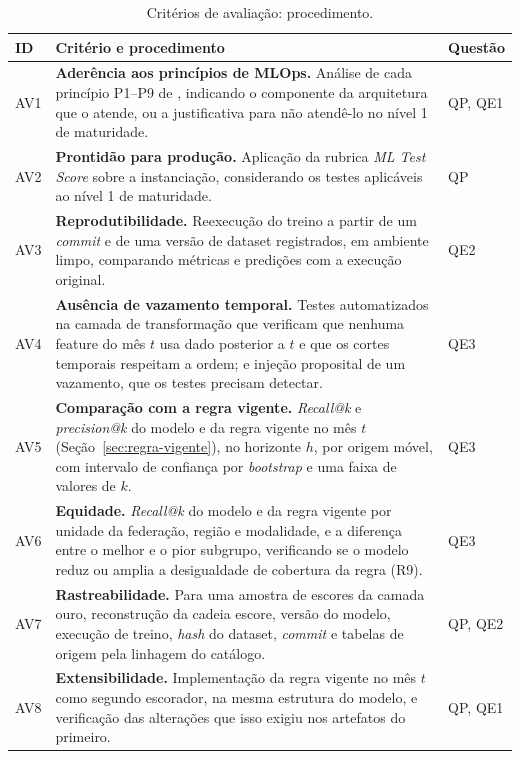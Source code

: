 \begin{table}[htbp]
	\centering
	\caption{Critérios de avaliação: procedimento.}
	\label{tab:avaliacao}
	\small
	\begin{tabularx}{\textwidth}{@{}l>{\raggedright\arraybackslash}X l@{}}
		\toprule
		\textbf{ID} & \textbf{Critério e procedimento} & \textbf{Questão} \\
		\midrule
		AV1 & \textbf{Aderência aos princípios de MLOps.} Análise de cada princípio P1--P9 de \citeonline{kreuzberger2023}, indicando o componente da arquitetura que o atende, ou a justificativa para não atendê-lo no nível 1 de maturidade. & QP, QE1 \\ \addlinespace
		AV2 & \textbf{Prontidão para produção.} Aplicação da rubrica \textit{ML Test Score} \cite{breck2017} sobre a instanciação, considerando os testes aplicáveis ao nível 1 de maturidade. & QP \\ \addlinespace
		AV3 & \textbf{Reprodutibilidade.} Reexecução do treino a partir de um \textit{commit} e de uma versão de dataset registrados, em ambiente limpo, comparando métricas e predições com a execução original. & QE2 \\ \addlinespace
		AV4 & \textbf{Ausência de vazamento temporal.} Testes automatizados na camada de transformação que verificam que nenhuma feature do mês $t$ usa dado posterior a $t$ e que os cortes temporais respeitam a ordem; e injeção proposital de um vazamento, que os testes precisam detectar. & QE3 \\ \addlinespace
		AV5 & \textbf{Comparação com a regra vigente.} \textit{Recall@k} e \textit{precision@k} do modelo e da regra vigente no mês $t$ (Seção~\ref{sec:regra-vigente}), no horizonte $h$, por origem móvel, com intervalo de confiança por \textit{bootstrap} e uma faixa de valores de $k$. & QE3 \\ \addlinespace
		AV6 & \textbf{Equidade.} \textit{Recall@k} do modelo e da regra vigente por unidade da federação, região e modalidade, e a diferença entre o melhor e o pior subgrupo, verificando se o modelo reduz ou amplia a desigualdade de cobertura da regra (R9). & QE3 \\ \addlinespace
		AV7 & \textbf{Rastreabilidade.} Para uma amostra de escores da camada ouro, reconstrução da cadeia escore, versão do modelo, execução de treino, \textit{hash} do dataset, \textit{commit} e tabelas de origem pela linhagem do catálogo. & QP, QE2 \\ \addlinespace
		AV8 & \textbf{Extensibilidade.} Implementação da regra vigente no mês $t$ como segundo escorador, na mesma estrutura do modelo, e verificação das alterações que isso exigiu nos artefatos do primeiro. & QP, QE1 \\
		\bottomrule
	\end{tabularx}
\end{table}

